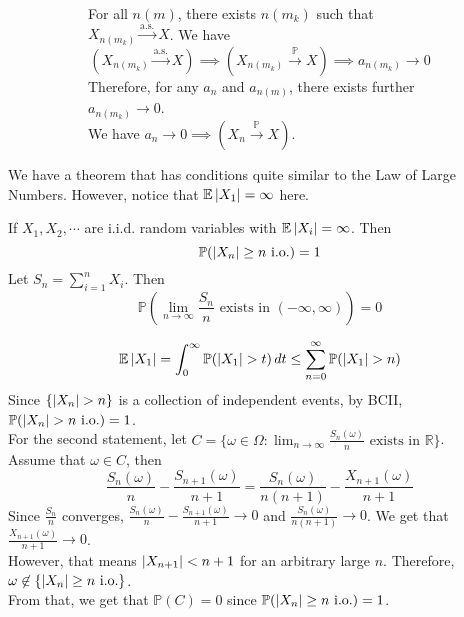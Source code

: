 \documentclass{huhtakm-template-book}
\newcommand{\prob}{\mathbb{P}}
\newcommand{\expect}{\mathbb{E}}
\begin{document}
\begin{proofing}
\begin{figure}[h!]
\begin{subfigure}[t]{0.9\textwidth}
                For all $n(m)$, there exists $n(m_{k})$ such that $X_{n(m_{k})}\xrightarrow{\text{a.s.}}X$. We have
                \begin{equation*}
                    (X_{n(m_{k})}\xrightarrow{\text{a.s.}}X)\implies(X_{n(m_{k})}\xrightarrow{\prob}X)\implies a_{n(m_{k})}\to 0
                \end{equation*}
                Therefore, for any $a_{n}$ and $a_{n(m)}$, there exists further $a_{n(m_{k})}\to 0$.\\
                We have $a_{n}\to 0\implies(X_{n}\xrightarrow{\prob}X)$.
            \end{subfigure}
        \end{figure}
    \end{proofing}
    We have a theorem that has conditions quite similar to the Law of Large Numbers. However, notice that $\expect\abs{X_{1}}=\infty$ here.
    \begin{thm}
        If $X_{1},X_{2},\cdots$ are i.i.d. random variables with $\expect\abs{X_{i}}=\infty$. Then
        \begin{equation*}
            \prob(\abs{X_{n}}\geq n\text{ i.o.})=1
        \end{equation*}
        Let $S_{n}=\sum_{i=1}^{n}X_{i}$. Then
        \begin{equation*}
            \prob\left(\lim_{n\to\infty}\frac{S_{n}}{n}\text{ exists in }(-\infty,\infty)\right)=0
        \end{equation*}
    \end{thm}
    \begin{proofing}
        \begin{equation*}
            \expect\abs{X_{1}}=\int_{0}^{\infty}\prob(\abs{X_{1}}>t)\,dt\leq\sum_{n=0}^{\infty}\prob(\abs{X_{1}}>n)
        \end{equation*}
        Since $\{\abs{X_{n}}>n\}$ is a collection of independent events, by BCII, $\prob(\abs{X_{n}}>n\text{ i.o.})=1$.\\
        For the second statement, let $C=\{\omega\in\Omega:\lim_{n\to\infty}\frac{S_{n}(\omega)}{n}\text{ exists in }\mathbb{R}\}$.\\
        Assume that $\omega\in C$, then
        \begin{equation*}
            \frac{S_{n}(\omega)}{n}-\frac{S_{n+1}(\omega)}{n+1}=\frac{S_{n}(\omega)}{n(n+1)}-\frac{X_{n+1}(\omega)}{n+1}
        \end{equation*}
        Since $\frac{S_{n}}{n}$ converges, $\frac{S_{n}(\omega)}{n}-\frac{S_{n+1}(\omega)}{n+1}\to 0$ and $\frac{S_{n}(\omega)}{n(n+1)}\to 0$. We get that $\frac{X_{n+1}(\omega)}{n+1}\to 0$.\\
        However, that means $\left|{X_{n+1}}\right|<n+1$ for an arbitrary large $n$. Therefore, $\omega\not\in\{\left|{X_{n}}\right|\geq n\text{ i.o.}\}$.\\
        From that, we get that $\prob(C)=0$ since $\prob(\abs{X_{n}}\geq n\text{ i.o.})=1$.
    \end{proofing}
\end{document}
